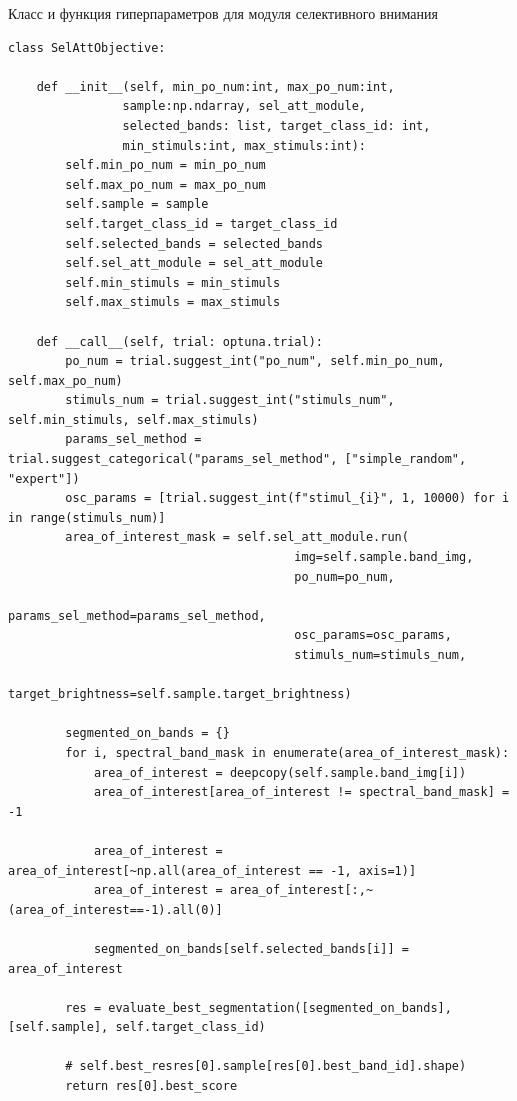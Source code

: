 \documentclass[14pt, russian]{scrartcl}
\begin{document}
\begin{listing}[!htt]
    \caption{Класс и функция гиперпараметров для модуля селективного внимания}
    \label{lst:contour_extr_sobel}
    \begin{verbatim}
class SelAttObjective:

    def __init__(self, min_po_num:int, max_po_num:int,
                sample:np.ndarray, sel_att_module,
                selected_bands: list, target_class_id: int,
                min_stimuls:int, max_stimuls:int):
        self.min_po_num = min_po_num
        self.max_po_num = max_po_num
        self.sample = sample
        self.target_class_id = target_class_id
        self.selected_bands = selected_bands
        self.sel_att_module = sel_att_module
        self.min_stimuls = min_stimuls
        self.max_stimuls = max_stimuls

    def __call__(self, trial: optuna.trial):
        po_num = trial.suggest_int("po_num", self.min_po_num, self.max_po_num)
        stimuls_num = trial.suggest_int("stimuls_num", self.min_stimuls, self.max_stimuls)
        params_sel_method = trial.suggest_categorical("params_sel_method", ["simple_random", "expert"])
        osc_params = [trial.suggest_int(f"stimul_{i}", 1, 10000) for i in range(stimuls_num)]
        area_of_interest_mask = self.sel_att_module.run(
                                        img=self.sample.band_img, 
                                        po_num=po_num, 
                                        params_sel_method=params_sel_method,
                                        osc_params=osc_params,
                                        stimuls_num=stimuls_num,
                                        target_brightness=self.sample.target_brightness)
        
        segmented_on_bands = {}
        for i, spectral_band_mask in enumerate(area_of_interest_mask):  
            area_of_interest = deepcopy(self.sample.band_img[i])
            area_of_interest[area_of_interest != spectral_band_mask] = -1

            area_of_interest = area_of_interest[~np.all(area_of_interest == -1, axis=1)]
            area_of_interest = area_of_interest[:,~(area_of_interest==-1).all(0)]

            segmented_on_bands[self.selected_bands[i]] = area_of_interest

        res = evaluate_best_segmentation([segmented_on_bands], [self.sample], self.target_class_id)

        # self.best_resres[0].sample[res[0].best_band_id].shape)
        return res[0].best_score
    \end{verbatim}
\end{listing}
\end{document}
